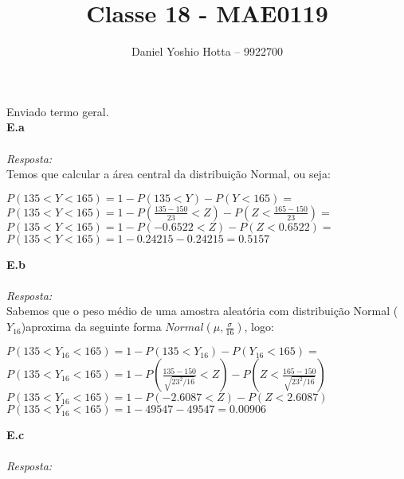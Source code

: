 \documentclass{article}
\begin{document}
	
	\title{Classe 18 - MAE0119}
	\author{Daniel Yoshio Hotta – 9922700}
	
	\maketitle	
	
	Enviado termo geral.\\
	
	\textbf {E.a} 
	\\ \\
	\textit {Resposta:} \\
    
    Temos que calcular a área central da distribuição Normal, ou seja:\\
    
    \begin{center}
    	$P (135 < Y < 165) = 1 - P (135 < Y) - P (Y < 165) = $\\
    	$P (135 < Y < 165) = 1 - P (\frac{135 - 150}{23} < Z) - P (Z < \frac{165-150}{23}) = $\\
    	$P (135 < Y < 165) = 1 - P (-0.6522 < Z) - P (Z < 0.6522) = $\\
    	$P (135 < Y < 165) = 1 - 0.24215 - 0.24215 = 0.5157$
    \end{center}
    
    \textbf {E.b} 
    \\ \\
    \textit {Resposta:} \\	
        
    Sabemos que o peso médio de uma amostra aleatória com distribuição Normal ($Y_{16}$)aproxima da seguinte forma $Normal (\mu, \frac{\sigma}{16})$, logo:\\
    
    \begin{center}
    	$P(135 < Y_{16} < 165) = 1 - P (135 < Y_{16}) - P (Y_{16} < 165) = $\\
    	$P(135 < Y_{16} < 165) = 1 - P (\frac{135 - 150}{\sqrt{23^2 / 16}}< Z) - P (Z < \frac{165 - 150}{\sqrt{23^2 / 16}})$\\
    	$P(135 < Y_{16} < 165) = 1 - P (-2.6087 < Z) - P(Z < 2.6087)$\\
    	$P(135 < Y_{16} < 165) = 1 - 49547 - 49547 = 0.00906$
    \end{center}

    \textbf {E.c} 
    \\ \\
    \textit {Resposta:} \\
    
\end{document}
